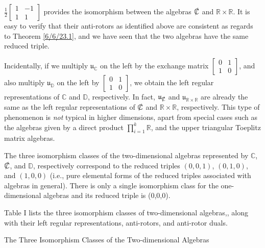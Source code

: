 \documentclass{amsart}
\theoremstyle{definition}
\numberwithin{theorem}{section}
\numberwithin{equation}{section}
\begin{document}
$\frac{1}{2}\left[\begin{array}{ccc}
 1 & -1   \\ 
 1 & 1    
\end{array}\right]$ provides the isomorphism between the algebras $\slashed{\mathbb{C}}$ and $\mathbb{R} \times\mathbb{R}$.  It is easy to verify that their anti-rotors as identified above are consistent as regards to Theorem \ref{6/6/23.1}, and we have seen that the two algebras have the same reduced triple.  


Incidentally, if we multiply $\mathfrak{u}_{\mathbb{C}}$ on the left by the exchange matrix $\left[\begin{array}{ccc}
 0 & 1   \\ 
 1 & 0    
\end{array}\right]$, and also multiply $\mathfrak{u}_{\mathbb{D}}$ on the left by $\left[\begin{array}{ccc}
 0 & 1   \\ 
 1 & 0    
\end{array}\right]$, we obtain the left regular representations of $\mathbb{C}$ and $\mathbb{D}$, respectively.   In fact, $\mathfrak{u}_{\slashed{\mathbb{C}}}$ and $\mathfrak{u}_{\mathbb{R}\times\mathbb{R}}$ are already the same as the left regular representations of $\slashed{\mathbb{C}}$ and $\mathbb{R}\times\mathbb{R}$, respectively.  This type of phenomenon is {\it not} typical in higher dimensions, apart from special cases such as the algebras given by a direct product $\prod_{i=1}^k \mathbb{R}$, and the upper triangular Toeplitz matrix algebras.

 The three isomorphism classes of the two-dimensional algebras represented by $\mathbb{C}$, $\slashed{\mathbb{C}}$, and $\mathbb{D}$, respectively correspond to the reduced triples  $(0,0,1)$, $(0,1,0)$, and $(1,0,0)$ (i.e., pure elemental forms of the reduced triples associated with algebras in general).  There is only a single isomorphism class for the one-dimensional algebras and its reduced triple is (0,0,0).
 
Table I lists the three isomorphism classes of two-dimensional algebras,, along with their left regular representations, anti-rotors, and anti-rotor duals. 

\vspace{1.5cm}

  \centerline{\large The Three Isomorphism Classes of the Two-dimensional Algebras } 

\vspace{.5cm}
\end{document}

